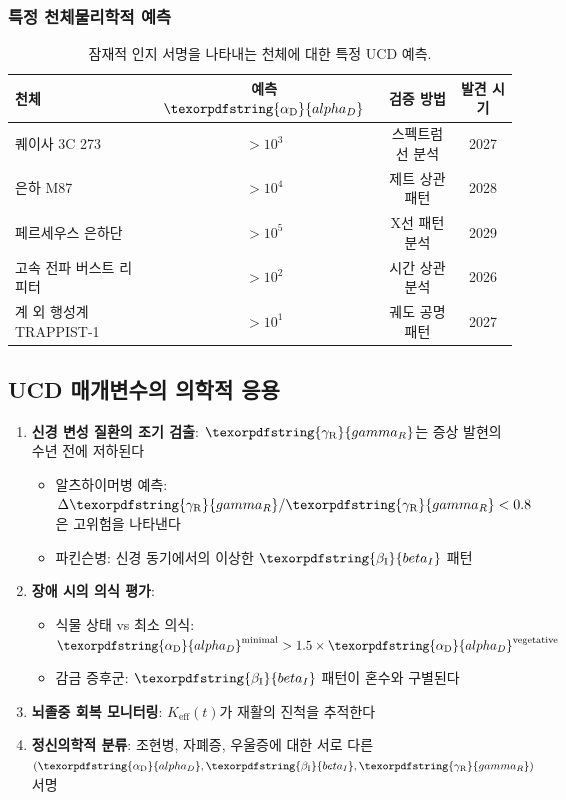 \documentclass[11pt,a4paper]{article}
\DeclareRobustCommand{\alD}{\texorpdfstring{\ensuremath{\alpha_{\mathrm{D}}}}{alpha_D}}
\DeclareRobustCommand{\beI}{\texorpdfstring{\ensuremath{\beta_{\mathrm{I}}}}{beta_I}}
\DeclareRobustCommand{\gaR}{\texorpdfstring{\ensuremath{\gamma_{\mathrm{R}}}}{gamma_R}}
\newcommand{\eff}{\mathrm{eff}}
\newcommand{\Ke}{K_{\eff}}
\begin{document}
	\subsubsection{특정 천체물리학적 예측}
	
	\begin{table}[ht]
		\centering
		\begin{tabular}{lccc}
			\toprule
			\textbf{천체} & \textbf{예측 \(\alD\)} & \textbf{검증 방법} & \textbf{발견 시기} \\
			\midrule
			퀘이사 3C 273 & \(>10^3\) & 스펙트럼선 분석 & 2027 \\
			은하 M87 & \(>10^4\) & 제트 상관 패턴 & 2028 \\
			페르세우스 은하단 & \(>10^5\) & X선 패턴 분석 & 2029 \\
			고속 전파 버스트 리피터 & \(>10^2\) & 시간 상관 분석 & 2026 \\
			계 외 행성계 TRAPPIST-1 & \(>10^1\) & 궤도 공명 패턴 & 2027 \\
			\bottomrule
		\end{tabular}
		\caption{잠재적 인지 서명을 나타내는 천체에 대한 특정 UCD 예측.}
		\label{tab:astro-predictions}
	\end{table}
	
	\subsection{UCD 매개변수의 의학적 응용}
	
	\begin{enumerate}
		\item \textbf{신경 변성 질환의 조기 검출}: \(\gaR\)는 증상 발현의 수년 전에 저하된다
		\begin{itemize}
			\item 알츠하이머병 예측: \(\Delta\gaR/\gaR < 0.8\)은 고위험을 나타낸다
			\item 파킨슨병: 신경 동기에서의 이상한 \(\beI\) 패턴
		\end{itemize}
		
		\item \textbf{장애 시의 의식 평가}:
		\begin{itemize}
			\item 식물 상태 vs 최소 의식: \(\alD^{\mathrm{minimal}} > 1.5 \times \alD^{\mathrm{vegetative}}\)
			\item 감금 증후군: \(\beI\) 패턴이 혼수와 구별된다
		\end{itemize}
		
		\item \textbf{뇌졸중 회복 모니터링}: \(\Ke(t)\)가 재활의 진척을 추적한다
		\item \textbf{정신의학적 분류}: 조현병, 자폐증, 우울증에 대한 서로 다른 \((\alD, \beI, \gaR)\) 서명
	\end{enumerate}
	
\end{document}
